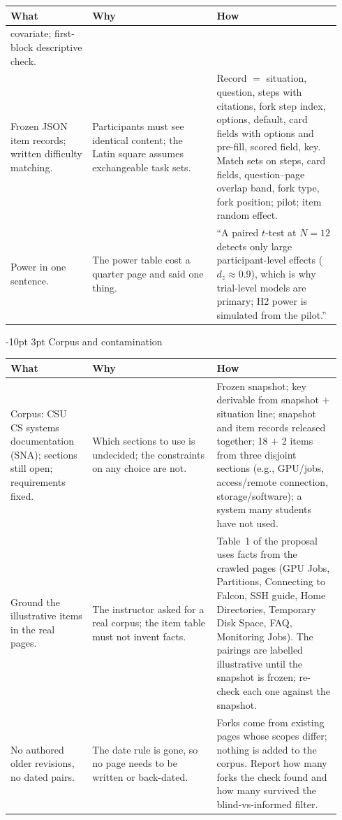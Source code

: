 \documentclass[9pt,letterpaper]{extarticle}
\makeatletter
\newcommand{\rowsep}{\noalign{\vskip 1.5pt}\arrayrulecolor{black!35}\hline\arrayrulecolor{black}\noalign{\vskip 1.5pt}}
\renewcommand\section{\@startsection{section}{1}{\z@}%
  {-10pt \@plus -2pt \@minus -1pt}{3pt}%
  {\sffamily\bfseries\large\color{accent}}}
\let\oldsection\section
\renewcommand{\section}{\needspace{7\baselineskip}\oldsection}
\newcommand{\wwh}{\toprule
\sffamily\bfseries\color{accent} What & \sffamily\bfseries\color{accent} Why & \sffamily\bfseries\color{accent} How \\
\midrule}
\newenvironment{wwhtable}{\footnotesize
\begin{longtable}{@{}>{\raggedright\arraybackslash}p{0.23\linewidth}>{\raggedright\arraybackslash}p{0.355\linewidth}>{\raggedright\arraybackslash}p{0.355\linewidth}@{}}
\wwh}{\bottomrule\end{longtable}}
\makeatother
\begin{document}
\begin{wwhtable}
covariate; first-block descriptive check. \\
\rowsep
Frozen JSON item records; written difficulty matching. &
Participants must see identical content; the Latin square assumes
exchangeable task sets. &
Record $=$ situation, question, steps with citations, fork step index,
options, default, card fields with options and pre-fill, scored field, key.
Match sets on steps, card fields, question--page overlap band, fork type,
fork position; pilot; item random effect. \\
\rowsep
Power in one sentence. &
The power table cost a quarter page and said one thing. &
``A paired $t$-test at $N{=}12$ detects only large participant-level effects
($d_z \approx 0.9$), which is why trial-level models are primary; H2 power is
simulated from the pilot.'' \\
\end{wwhtable}

\section{Corpus and contamination}
\begin{wwhtable}
Corpus: CSU CS systems documentation (SNA); sections still open;
requirements fixed. &
Which sections to use is undecided; the constraints on any choice are not. &
Frozen snapshot; key derivable from snapshot $+$ situation line; snapshot and
item records released together; 18 $+$ 2 items from three disjoint sections
(e.g., GPU/jobs, access/remote connection, storage/software); a system many
students have not used. \\
\rowsep
Ground the illustrative items in the real pages. &
The instructor asked for a real corpus; the item table must not invent
facts. &
Table~1 of the proposal uses facts from the crawled pages (GPU Jobs,
Partitions, Connecting to Falcon, SSH guide, Home Directories, Temporary Disk
Space, FAQ, Monitoring Jobs). The pairings are labelled illustrative until
the snapshot is frozen; re-check each one against the snapshot. \\
\rowsep
No authored older revisions, no dated pairs. &
The date rule is gone, so no page needs to be written or back-dated. &
Forks come from existing pages whose scopes differ; nothing is added to the
corpus. Report how many forks the check found and how many survived the
blind-vs-informed filter. \\
\end{wwhtable}
\end{document}
